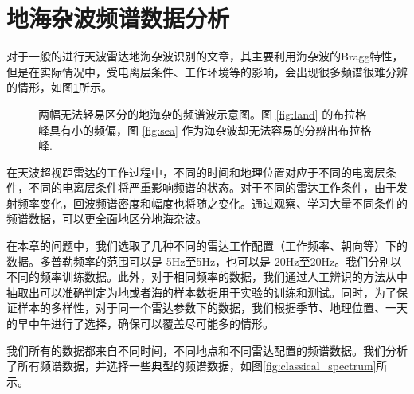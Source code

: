 \section{地海杂波频谱数据分析}
对于一般的进行天波雷达地海杂波识别的文章，其主要利用海杂波的Bragg特性，但是在实际情况中，受电离层条件、工作环境等的影响，会出现很多频谱很难分辨的情形，如图\ref{fig:spectrum}所示。
\begin{figure}[H]
	\centering
	\hfil
	\caption{两幅无法轻易区分的地海杂的频谱波示意图。图 \ref{fig:land} 的布拉格峰具有小的频偏，图 \ref{fig:sea} 作为海杂波却无法容易的分辨出布拉格峰.}
	\label{fig:spectrum}
\end{figure}
在天波超视距雷达的工作过程中，不同的时间和地理位置对应于不同的电离层条件，不同的电离层条件将严重影响频谱的状态。对于不同的雷达工作条件，由于发射频率变化，回波频谱密度和幅度也将随之变化。通过观察、学习大量不同条件的频谱数据，可以更全面地区分地海杂波。

在本章的问题中，我们选取了几种不同的雷达工作配置（工作频率、朝向等）下的数据。多普勒频率的范围可以是-5Hz至5Hz，也可以是-20Hz至20Hz。我们分别以不同的频率训练数据。此外，对于相同频率的数据，我们通过人工辨识的方法从中抽取出可以准确判定为地或者海的样本数据用于实验的训练和测试。同时，为了保证样本的多样性，对于同一个雷达参数下的数据，我们根据季节、地理位置、一天的早中午进行了选择，确保可以覆盖尽可能多的情形。

我们所有的数据都来自不同时间，不同地点和不同雷达配置的频谱数据。我们分析了所有频谱数据，并选择一些典型的频谱数据，如图\ref{fig:classical_spectrum}所示。


